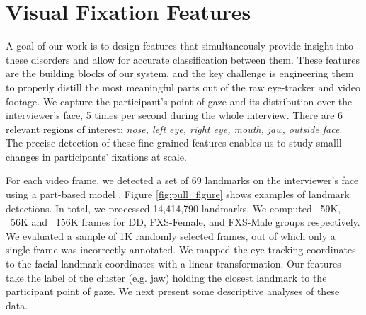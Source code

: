 \documentclass{llncs}
\begin{document}
  \vspace{-2 em}
  \section{Visual Fixation Features}
  \vspace{-1 em}
  \label{sec:feature_extraction}
A goal of our work is to design features that simultaneously provide insight into these disorders and allow for accurate classification between them. These features are the building blocks of our system, and the key challenge is engineering them to properly distill the most meaningful parts out of the raw eye-tracker and video footage. We capture the participant's point of gaze and its distribution over the interviewer's face, 5 times per second during the whole interview. There are 6 relevant regions of interest: \textit{nose, left eye, right eye, mouth, jaw, outside face}. The precise detection of these fine-grained features enables us to study smalll changes in participants' fixations at scale.


For each video frame, we detected a set of 69 landmarks on the interviewer's face using a part-based model \cite{dpmface}. Figure \ref{fig:pull_figure} shows examples of landmark detections. In total, we processed 14,414,790 landmarks. %
We computed ~59K, ~56K and ~156K frames for DD, FXS-Female, and FXS-Male groups respectively. We evaluated a sample of 1K randomly selected frames, out of which only a single frame was incorrectly annotated. We mapped the eye-tracking coordinates to the facial landmark coordinates with a linear transformation. Our features take the label of the cluster (e.g. jaw) holding the closest landmark to the participant point of gaze. We next present some descriptive analyses of these data.
\end{document}
